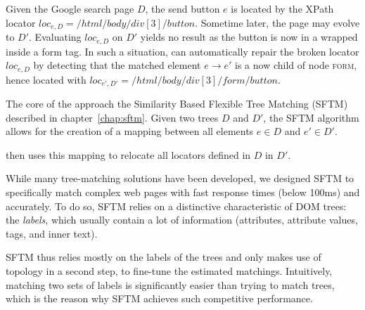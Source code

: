 \begin{ex}
Given the Google search page $D$, the send button $e$ is located by the XPath locator $loc_{e,D} = /html/body/div[3]/button$.
Sometime later, the page may evolve to $D'$.
Evaluating $loc_{e,D}$ on $D'$ yields no result as the button is now in a wrapped inside a \textsf{form} tag.
In such a situation, \erratum{} can automatically repair the broken locator $loc_{e,D}$ by detecting that the matched element $e \to e'$ is a now child of node \textsc{form}, hence located with $loc_{e',D'} = /html/body/div[3]/form/button$.
\end{ex}

The core of the \erratum approach the Similarity Based Flexible Tree Matching (SFTM) described in chapter~\ref{chap:sftm}. 
Given two trees $D$ and $D'$, the SFTM algorithm allows for the creation of a mapping between all elements $e \in D$ and $e' \in D'$.

\erratum then uses this mapping to relocate all locators defined in $D$ in $D'$.

While many tree-matching solutions have been developed, we designed SFTM to specifically match complex web pages with fast response times (below 100ms) and accurately.
To do so, SFTM relies on a distinctive characteristic of DOM trees: the \emph{labels}, which usually contain a lot of information (attributes, attribute values, tags, and inner text).

SFTM thus relies mostly on the labels of the trees and only makes use of topology in a second step, to fine-tune the estimated matchings.
Intuitively, matching two sets of labels is significantly easier than trying to match trees, which is the reason why SFTM achieves such competitive performance.


